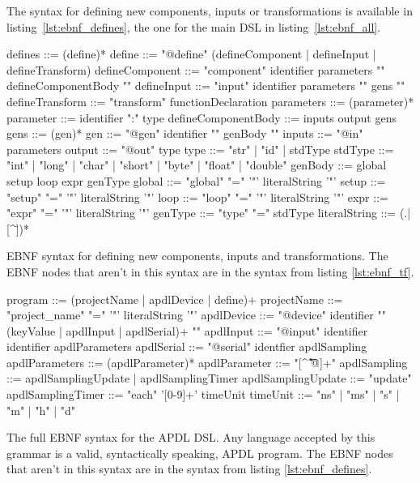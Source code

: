 The syntax for defining new components, inputs or transformations is available
in listing~\ref{lst:ebnf_defines}, the one for the main \gls{DSL} in
listing~\ref{lst:ebnf_all}.

\begin{listing}[!htbp]
  \centering
  \begin{ebnfcode}
defines ::= (define)*
define ::= "@define" (defineComponent | defineInput | defineTransform)
defineComponent ::= "component" identifier parameters "{" defineComponentBody "}"
defineInput ::= "input" identifier parameters "{" gens "}"
defineTransform ::= "transform" functionDeclaration
parameters ::= (parameter)*
parameter ::= identifier ":" type
defineComponentBody ::= inputs output gens
gens ::= (gen)*
gen ::= "@gen" identifier "{" genBody "}"
inputs ::= "@in" parameters
output ::= "@out" type
type ::= "str" | "id" | stdType
stdType ::= "int" | "long" | "char" | "short" | "byte" | "float" | "double"
genBody ::= global setup loop expr genType
global ::= "global" "=" '"' literalString '"'
setup ::= "setup" "=" '"' literalString '"'
loop ::= "loop" "=" '"' literalString '"'
expr ::= "expr" "=" '"' literalString '"'
genType ::= "type" "=" stdType
literalString ::= (.|[^\"])*
  \end{ebnfcode}
  \caption[EBNF syntax for APDL's new definition]{EBNF syntax for defining new
components, inputs and transformations. The EBNF nodes that aren't in this
syntax are in the syntax from listing \ref{lst:ebnf_tf}.}
  \label{lst:ebnf_defines}
\end{listing}

\begin{listing}[!htbp]
  \centering
  \begin{ebnfcode}
program ::= (projectName | apdlDevice | define)+
projectName ::= "project_name" "=" '"' literalString '"'
apdlDevice ::= "@device" identifier "{" (keyValue | apdlInput | apdlSerial)+ "}"
apdlInput ::= "@input" identifier identifier apdlParameters
apdlSerial ::= "@serial" identfier apdlSampling
apdlParameters ::= (apdlParameter)*
apdlParameter ::= "[^ \t\f\n\r{}@]+"
apdlSampling ::= apdlSamplingUpdate | apdlSamplingTimer
apdlSamplingUpdate ::= "update"
apdlSamplingTimer ::= "each" '[0-9]+' timeUnit
timeUnit ::= "ns" | "ms" | "s" | "m" | "h" | "d"
  \end{ebnfcode}
  \caption[EBNF syntax for the \gls{APDL} \gls{DSL}]{The full EBNF syntax for
the \gls{APDL} \gls{DSL}. Any language accepted by this grammar is a valid,
syntactically speaking, \gls{APDL} program. The EBNF nodes that aren't in this
syntax are in the syntax from listing \ref{lst:ebnf_defines}.}
  \label{lst:ebnf_all}
\end{listing}

